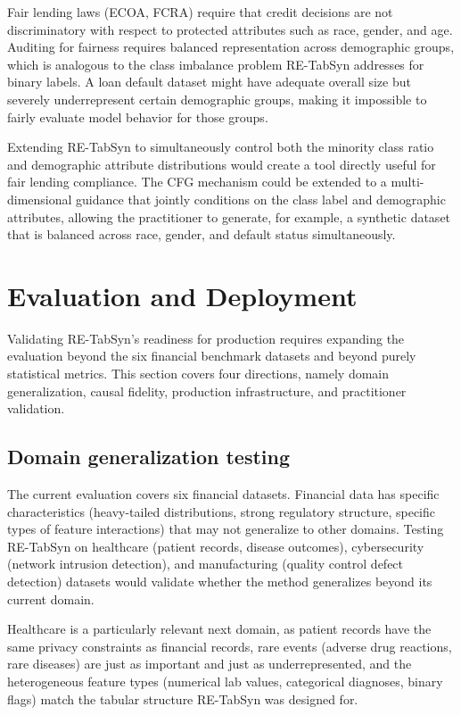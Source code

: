 Fair lending laws (ECOA, FCRA) require that credit decisions are not discriminatory with respect to protected attributes such as race, gender, and age. Auditing for fairness requires balanced representation across demographic groups, which is analogous to the class imbalance problem RE-TabSyn addresses for binary labels. A loan default dataset might have adequate overall size but severely underrepresent certain demographic groups, making it impossible to fairly evaluate model behavior for those groups.

Extending RE-TabSyn to simultaneously control both the minority class ratio and demographic attribute distributions would create a tool directly useful for fair lending compliance. The CFG mechanism could be extended to a multi-dimensional guidance that jointly conditions on the class label and demographic attributes, allowing the practitioner to generate, for example, a synthetic dataset that is balanced across race, gender, and default status simultaneously.

\section{Evaluation and Deployment}

Validating RE-TabSyn's readiness for production requires expanding the evaluation beyond the six financial benchmark datasets and beyond purely statistical metrics. This section covers four directions, namely domain generalization, causal fidelity, production infrastructure, and practitioner validation.

\subsection{Domain generalization testing}

The current evaluation covers six financial datasets. Financial data has specific characteristics (heavy-tailed distributions, strong regulatory structure, specific types of feature interactions) that may not generalize to other domains. Testing RE-TabSyn on healthcare (patient records, disease outcomes), cybersecurity (network intrusion detection), and manufacturing (quality control defect detection) datasets would validate whether the method generalizes beyond its current domain.

Healthcare is a particularly relevant next domain, as patient records have the same privacy constraints as financial records, rare events (adverse drug reactions, rare diseases) are just as important and just as underrepresented, and the heterogeneous feature types (numerical lab values, categorical diagnoses, binary flags) match the tabular structure RE-TabSyn was designed for.

